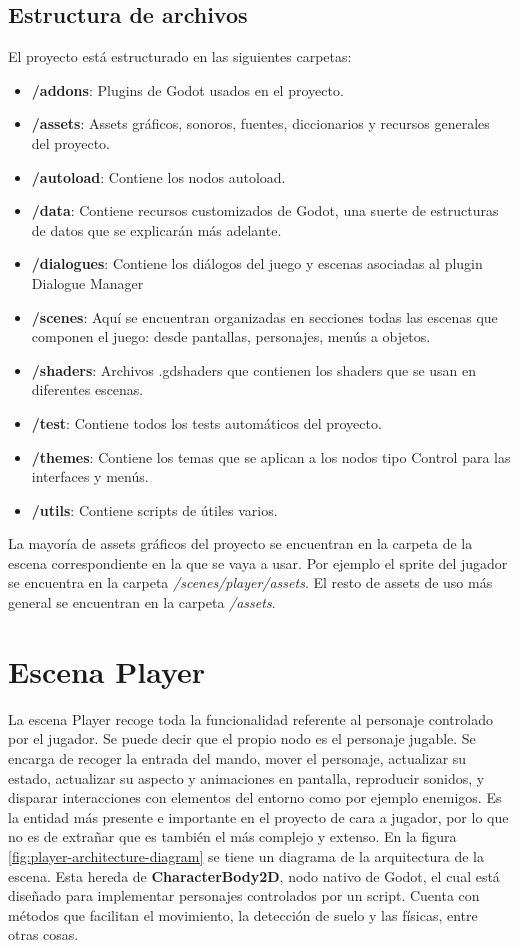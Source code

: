 \subsection{Estructura de archivos}

El proyecto está estructurado en las siguientes carpetas:

\begin{itemize}
    \item \textbf{/addons}: Plugins de Godot usados en el proyecto.
    \item \textbf{/assets}: Assets gráficos, sonoros, fuentes, diccionarios y recursos generales del proyecto.
    \item \textbf{/autoload}: Contiene los nodos autoload.
    \item \textbf{/data}: Contiene recursos customizados de Godot, una suerte de estructuras de datos que se explicarán más adelante.
    \item \textbf{/dialogues}: Contiene los diálogos del juego y escenas asociadas al plugin Dialogue Manager
    \item \textbf{/scenes}: Aquí se encuentran organizadas en secciones todas las escenas que componen el juego: desde pantallas, personajes, menús a objetos.
    \item \textbf{/shaders}: Archivos .gdshaders que contienen los shaders que se usan en diferentes escenas.
    \item \textbf{/test}: Contiene todos los tests automáticos del proyecto.
    \item \textbf{/themes}: Contiene los temas que se aplican a los nodos tipo Control para las interfaces y menús.
    \item \textbf{/utils}: Contiene scripts de útiles varios.
\end{itemize}

La mayoría de assets gráficos del proyecto se encuentran en la carpeta de la escena correspondiente en la que se vaya a usar. Por ejemplo el sprite del jugador se encuentra en la carpeta \textit{/scenes/player/assets}. El resto de assets de uso más general se encuentran en la carpeta \textit{/assets}.

\section{Escena Player}

La escena Player recoge toda la funcionalidad referente al personaje controlado por el jugador. Se puede decir que el propio nodo es el personaje jugable. Se encarga de recoger la entrada del mando, mover el personaje, actualizar su estado, actualizar su aspecto y animaciones en pantalla, reproducir sonidos, y disparar interacciones con elementos del entorno como por ejemplo enemigos. Es la entidad más presente e importante en el proyecto de cara a jugador, por lo que no es de extrañar que es también el más complejo y extenso. En la figura \ref{fig:player-architecture-diagram} se tiene un diagrama de la arquitectura de la escena. Esta hereda de \textbf{CharacterBody2D}, nodo nativo de Godot, el cual está diseñado para implementar personajes controlados por un script. Cuenta con métodos que facilitan el movimiento, la detección de suelo y las físicas, entre otras cosas.

